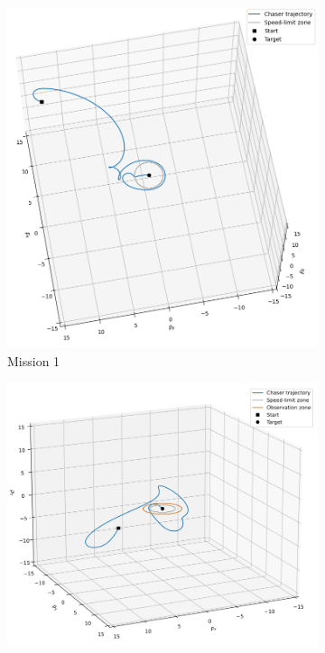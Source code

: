 \begin{figure}[t]
    \centering
    \begin{subfigure}[t]{0.4\linewidth}
        \centering
        \includegraphics[width=\linewidth]{images/local_methods/satellite_mission1_traj.png}
        \caption{Mission 1}
    \end{subfigure}
    \begin{subfigure}[t]{0.4\linewidth}
        \centering
        \includegraphics[width=\linewidth]{images/local_methods/satellite_mission2_traj.png}

\end{subfigure}
\end{figure}
